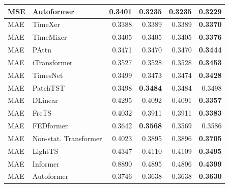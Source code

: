\begin{longtable}{llrrrr}
MSE & Autoformer & 0.3401 & 0.3235 & 0.3235 & \textbf{0.3229} \\
\midrule
MAE & TimeXer & 0.3388 & 0.3389 & 0.3389 & \textbf{0.3370} \\
MAE & TimeMixer & 0.3405 & 0.3405 & 0.3405 & \textbf{0.3376} \\
MAE & PAttn & 0.3471 & 0.3470 & 0.3470 & \textbf{0.3444} \\
MAE & iTransformer & 0.3527 & 0.3528 & 0.3528 & \textbf{0.3453} \\
MAE & TimesNet & 0.3499 & 0.3473 & 0.3474 & \textbf{0.3428} \\
MAE & PatchTST & 0.3498 & \textbf{0.3484} & 0.3484 & 0.3498 \\
MAE & DLinear & 0.4295 & 0.4092 & 0.4091 & \textbf{0.3357} \\
MAE & FreTS & 0.4032 & 0.3911 & 0.3911 & \textbf{0.3383} \\
MAE & FEDformer & 0.3642 & \textbf{0.3568} & 0.3569 & 0.3586 \\
MAE & Non-stat. Transformer & 0.4023 & 0.3895 & 0.3896 & \textbf{0.3705} \\
MAE & LightTS & 0.4347 & 0.4110 & 0.4109 & \textbf{0.3495} \\
MAE & Informer & 0.8890 & 0.4895 & 0.4896 & \textbf{0.4399} \\
MAE & Autoformer & 0.3746 & 0.3638 & 0.3638 & \textbf{0.3630} \\
\end{longtable}
\endgroup

